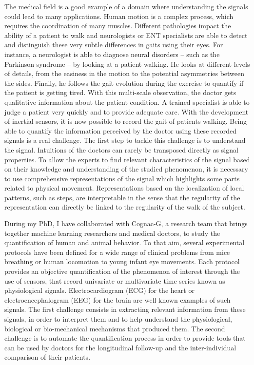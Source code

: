 \documentclass[../thesis.tex]{subfiles}
\begin{document}
The medical field is a good example of a domain where understanding the signals could lead to many applications. Human motion is a complex process, which requires the coordination of many muscles. Different pathologies impact the ability of a patient to walk and neurologists or ENT specialists are able to detect and distinguish these very subtle differences in gaits using their eyes. For instance, a neurologist is able to diagnose neural disorders -- such as the Parkinson syndrome -- by looking at a patient walking. He looks at different levels of details, from the easiness in the motion to the potential asymmetries between the sides. Finally, he follows the gait evolution during the exercise to quantify if the patient is getting tired. With this multi-scale observation, the doctor gets qualitative information about the patient condition. A trained specialist is able to judge a patient very quickly and to provide adequate care. With the development of inertial sensors, it is now possible to record the gait of patients walking. Being able to quantify the information perceived by the doctor using these recorded signals is a real challenge. The first step to tackle this challenge is to understand the signal. Intuitions of the doctors can rarely be transposed directly as signal properties. To allow the experts to find relevant characteristics of the signal based on their knowledge and understanding of the studied phenomenon, it is necessary to use comprehensive representations of the signal which highlights some parts related to physical movement. Representations based on the localization of local patterns, such as steps, are interpretable in the sense that the regularity of the representation can directly be linked to the regularity of the walk of the subject.


During my PhD, I have collaborated with Cognac-G, a research team that brings together machine learning researchers and medical doctors, to study the quantification of human and animal behavior. To that aim, several experimental protocols have been defined for a wide range of clinical problems from mice breathing or human locomotion to young infant eye movements. Each protocol provides an objective quantification of the phenomenon of interest through the use of sensors, that record univariate or multivariate time series known as physiological signals. Electrocardiogram (ECG) for the heart or electroencephalogram (EEG) for the brain are well known examples of such signals. The first challenge consists in extracting relevant information from these signals, in order to interpret them and to help understand the physiological, biological or bio-mechanical mechanisms that produced them. The second challenge is to automate the quantification process in order to provide tools that can be used by doctors for the longitudinal follow-up and the inter-individual comparison of their
patients.
	
\end{document}
